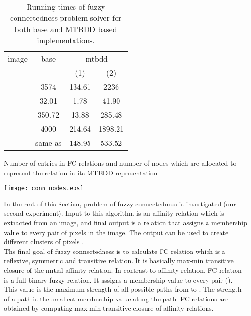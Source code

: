 \documentclass[4pt]{article}
\begin{document}
\begin{table}

\begin{center}
\begin{footnotesize}

\caption{Running times of fuzzy connectedness problem solver for both base and MTBDD based implementations.}
\label{conn_times}

\begin{tabular} {|c|c| cc |}
\hline
image & base & \multicolumn{2}{c}{mtbdd} \vline \\
      &   & (1)  & (2) \\ \hline
 & 3574 & 134.61 & 2236 \\ \hline
 & 32.01 & 1.78 & 41.90\\ \hline
 & 350.72 & 13.88 & 285.48 \\ \hline
 & 4000 & 214.64 & 1898.21 \\ \hline
 & same as  & 148.95 & 533.52 \\ \hline

\end{tabular}

\end{footnotesize}
\end{center}
\end{table}


\begin{table}

\begin{footnotesize}
\caption{Number of entries in FC relations and number of nodes which are allocated
to represent the relation in its MTBDD representation}
\label{conn_nodes}

\begin{center}


\texttt{[image: conn\_nodes.eps]}
\end{center}

\end{footnotesize}
\end{table}


In the rest of this Section, problem of fuzzy-connectedness is investigated (our second experiment). Input to this algorithm is an affinity relation which is extracted from an image, and final output is a relation that assigns a membership value to every pair of pixels in the image. The output can be used to create different clusters of pixels \cite{conn}.\\
The final goal of fuzzy connectedness is to calculate FC relation which is a reflexive, symmetric and transitive relation. It is basically max-min transitive closure of the initial affinity relation. In contrast to affinity relation, FC relation is a full binary fuzzy relation. It assigns a membership value to every pair (). This value is the maximum strength of all possible paths from  to . The strength of a path is the smallest membership value along the path. FC relations are obtained by computing max-min transitive closure of affinity relations.
\end{document}
